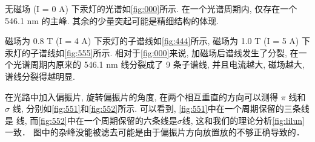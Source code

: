 \documentclass[font=default]{mpltx}
\begin{document}
  无磁场 (I = 0 A) 下汞灯的光谱如\autoref{fig:000}所示. 在一个光谱周期内, 仅存在一个 546.1 nm 的主峰. 其余的少量突起可能是精细结构的体现.
  \par
  磁场为 0.8 T (I = 4 A) 下汞灯的子谱线如\autoref{fig:444}所示, 磁场为 1.0 T (I = 5 A) 下汞灯的子谱线如\autoref{fig:555}所示. 
  相对于\autoref{fig:000}来说, 加磁场后谱线发生了分裂, 在一个光谱周期内原来的 546.1 nm 线分裂成了 9 条子谱线, 
  并且电流越大, 磁场越大, 谱线分裂得越明显. 

  在光路中加入偏振片, 旋转偏振片的角度, 在两个相互垂直的方向可以测得 $\pi$ 线和 $\sigma$ 线, 分别如\autoref{fig:551}和\autoref{fig:552}所示.
  可以看到, \autoref{fig:551}中在一个周期保留的三条线是 \pi 线, 
  而\autoref{fig:552}中在一个周期保留的六条线是$\sigma$线, 这和我们的理论分析\autoref{fig:lilun}一致．
  图中的杂峰没能被滤去可能是由于偏振片方向放置放的不够正确导致的．
\end{document}
